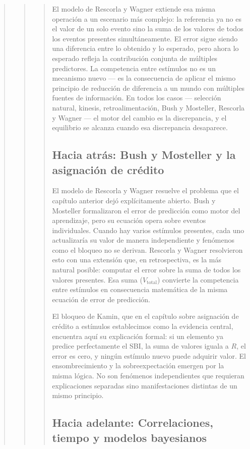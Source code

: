 \documentclass[
  letterpaper,
  DIV=11,
  numbers=noendperiod]{scrreprt}
\begin{document}
\begin{tcolorbox}[enhanced jigsaw, toprule=.15mm, arc=.35mm, colback=white, opacityback=0, colframe=quarto-callout-note-color-frame, breakable, rightrule=.15mm, left=2mm, leftrule=.75mm, bottomrule=.15mm]
\begin{quote}
\begin{quote}
\begin{quote}
El modelo de Rescorla y Wagner extiende esa misma operación a un
escenario más complejo: la referencia ya no es el valor de un solo
evento sino la suma de los valores de todos los eventos presentes
simultáneamente. El error sigue siendo una diferencia entre lo obtenido
y lo esperado, pero ahora lo esperado refleja la contribución conjunta
de múltiples predictores. La competencia entre estímulos no es un
mecanismo nuevo --- es la consecuencia de aplicar el mismo principio de
reducción de diferencia a un mundo con múltiples fuentes de información.
En todos los casos --- selección natural, kinesis, retroalimentación,
Bush y Mosteller, Rescorla y Wagner --- el motor del cambio es la
discrepancia, y el equilibrio se alcanza cuando esa discrepancia
desaparece.

\subsection{Hacia atrás: Bush y Mosteller y la asignación de
crédito}\label{hacia-atruxe1s-bush-y-mosteller-y-la-asignaciuxf3n-de-cruxe9dito}

El modelo de Rescorla y Wagner resuelve el problema que el capítulo
anterior dejó explícitamente abierto. Bush y Mosteller formalizaron el
error de predicción como motor del aprendizaje, pero su ecuación opera
sobre eventos individuales. Cuando hay varios estímulos presentes, cada
uno actualizaría su valor de manera independiente y fenómenos como el
bloqueo no se derivan. Rescorla y Wagner resolvieron esto con una
extensión que, en retrospectiva, es la más natural posible: computar el
error sobre la suma de todos los valores presentes. Esa suma
(\(V_{\text{total}}\)) convierte la competencia entre estímulos en
consecuencia matemática de la misma ecuación de error de predicción.

El bloqueo de Kamin, que en el capítulo sobre asignación de crédito a
estímulos establecimos como la evidencia central, encuentra aquí su
explicación formal: si un elemento ya predice perfectamente el SBI, la
suma de valores iguala a \(R\), el error es cero, y ningún estímulo
nuevo puede adquirir valor. El ensombrecimiento y la sobreexpectación
emergen por la misma lógica. No son fenómenos independientes que
requieran explicaciones separadas sino manifestaciones distintas de un
mismo principio.

\subsection{Hacia adelante: Correlaciones, tiempo y modelos
bayesianos}\label{hacia-adelante-correlaciones-tiempo-y-modelos-bayesianos}


\end{quote}
\end{quote}
\end{quote}
\end{tcolorbox}
\end{document}
